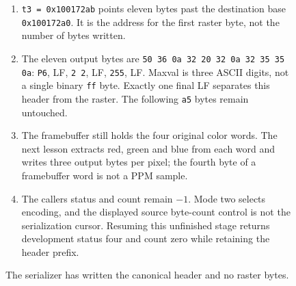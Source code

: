 \begin{figure}[htbp]
\begin{minipage}{\linewidth}
\begin{enumerate}
      \item \texttt{t3 = 0x100172ab} points eleven bytes past the destination base \texttt{0x100172a0}. It is the address for the first raster byte, not the number of bytes written.
      \item The eleven output bytes are \texttt{50 36 0a 32 20 32 0a 32 35 35 0a}: \texttt{P6}, LF, \texttt{2 2}, LF, \texttt{255}, LF. Maxval is three ASCII digits, not a single binary \texttt{ff} byte. Exactly one final LF separates this header from the raster. The following \texttt{a5} bytes remain untouched.
      \item The framebuffer still holds the four original color words. The next lesson extracts red, green and blue from each word and writes three output bytes per pixel; the fourth byte of a framebuffer word is not a PPM sample.
      \item The caller\textquotesingle s status and count remain $-1$. Mode two selects encoding, and the displayed source byte-count control is not the serialization cursor. Resuming this unfinished stage returns development status four and count zero while retaining the header prefix.
    \end{enumerate}
  \end{minipage}
  \caption{The serializer has written the canonical header and no raster bytes.}
  \label{capture:029-binary-ppm-f03}
  \label{ppm-f03}
\end{figure}
\par
